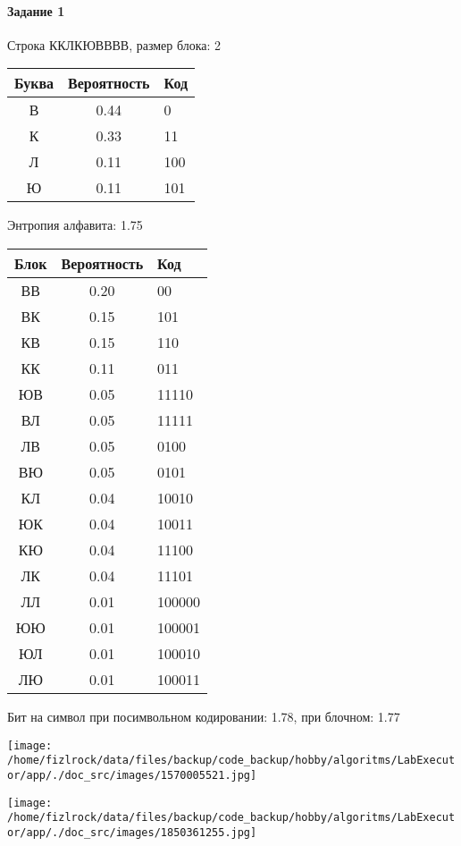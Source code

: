 \documentclass[a4paper, 12pt]{article}
\begin{document}
\paragraph{Задание 1}

Строка ККЛКЮВВВВ, размер блока: 2
\begin{center}
 \begin{tabular}{ |c|c|l| } 
  \hline
     Буква & Вероятность & Код\\ \hline
В & 0.44 & 0\\\hline
К & 0.33 & 11\\\hline
Л & 0.11 & 100\\\hline
Ю & 0.11 & 101
\\ \hline \end{tabular}
\end{center}
Энтропия алфавита: 1.75
\begin{center}
 \begin{tabular}{ |c|c|l| } 
  \hline
     Блок & Вероятность & Код\\ \hline
ВВ & 0.20 & 00\\\hline
ВК & 0.15 & 101\\\hline
КВ & 0.15 & 110\\\hline
КК & 0.11 & 011\\\hline
ЮВ & 0.05 & 11110\\\hline
ВЛ & 0.05 & 11111\\\hline
ЛВ & 0.05 & 0100\\\hline
ВЮ & 0.05 & 0101\\\hline
КЛ & 0.04 & 10010\\\hline
ЮК & 0.04 & 10011\\\hline
КЮ & 0.04 & 11100\\\hline
ЛК & 0.04 & 11101\\\hline
ЛЛ & 0.01 & 100000\\\hline
ЮЮ & 0.01 & 100001\\\hline
ЮЛ & 0.01 & 100010\\\hline
ЛЮ & 0.01 & 100011
\\ \hline \end{tabular}
\end{center}
Бит на символ при посимвольном кодировании: 1.78, при блочном: 1.77

\texttt{[image: /home/fizlrock/data/files/backup/code\_backup/hobby/algoritms/LabExecutor/app/./doc\_src/images/1570005521.jpg]}

\texttt{[image: /home/fizlrock/data/files/backup/code\_backup/hobby/algoritms/LabExecutor/app/./doc\_src/images/1850361255.jpg]}
\pagebreak
\end{document}
